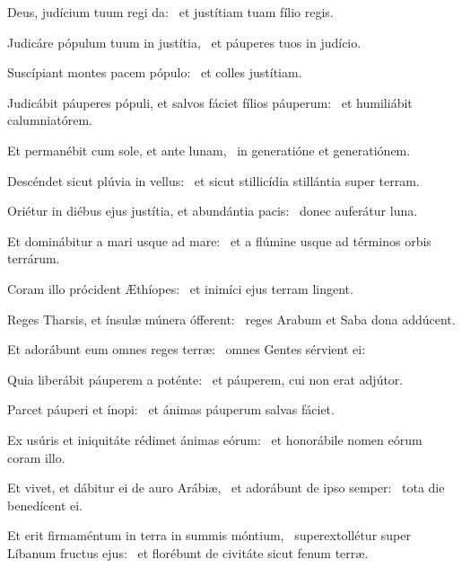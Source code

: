 \item Deus, judícium tuum regi da:~\psstar{} et justítiam tuam fílio regis.

\item Judicáre pópulum tuum in justítia,~\psstar{} et páuperes tuos in judício.

\item Suscípiant montes pacem pópulo:~\psstar{} et colles justítiam.

\item Judicábit páuperes pópuli, et salvos fáciet fílios páuperum:~\psstar{} et humiliábit calumniatórem.

\item Et permanébit cum sole, et ante lunam,~\psstar{} in generatióne et generatiónem.

\item Descéndet sicut plúvia in vellus:~\psstar{} et sicut stillicídia stillántia super terram.

\item Oriétur in diébus ejus justítia, et abundántia pacis:~\psstar{} donec auferátur luna.

\item Et dominábitur a mari usque ad mare:~\psstar{} et a flúmine usque ad términos orbis terrárum.

\item Coram illo prócident Æthíopes:~\psstar{} et inimíci ejus terram lingent.

\item Reges Tharsis, et ínsulæ múnera ófferent:~\psstar{} reges Arabum et Saba dona addúcent.

\item Et adorábunt eum omnes reges terræ:~\psstar{} omnes Gentes sérvient ei:

\item Quia liberábit páuperem a poténte:~\psstar{} et páuperem, cui non erat adjútor.

\item Parcet páuperi et ínopi:~\psstar{} et ánimas páuperum salvas fáciet.

\item Ex usúris et iniquitáte rédimet ánimas eórum:~\psstar{} et honorábile nomen eórum coram illo.

\item Et vivet, et dábitur ei de auro Arábiæ,~\pscross{} et adorábunt de ipso semper:~\psstar{} tota die benedícent ei.

\item Et erit firmaméntum in terra in summis móntium,~\pscross{} superextollétur super Líbanum fructus ejus:~\psstar{} et florébunt de civitáte sicut fenum terræ.

